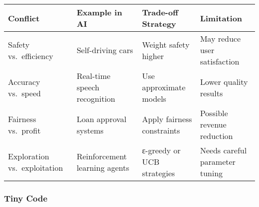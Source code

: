 \documentclass[
  letterpaper,
  DIV=11,
  numbers=noendperiod]{scrreprt}
\begin{document}
\begin{longtable}[]{@{}
  >{\raggedright\arraybackslash}p{}
  >{\raggedright\arraybackslash}p{}
  >{\raggedright\arraybackslash}p{}
  >{\raggedright\arraybackslash}p{}@{}}
\toprule\noalign{}
\begin{minipage}[b]{\linewidth}\raggedright
Conflict
\end{minipage} & \begin{minipage}[b]{\linewidth}\raggedright
Example in AI
\end{minipage} & \begin{minipage}[b]{\linewidth}\raggedright
Trade-off Strategy
\end{minipage} & \begin{minipage}[b]{\linewidth}\raggedright
Limitation
\end{minipage} \\
\midrule\noalign{}
\endhead
\bottomrule\noalign{}
\endlastfoot
Safety vs.~efficiency & Self-driving cars & Weight safety higher & May
reduce user satisfaction \\
Accuracy vs.~speed & Real-time speech recognition & Use approximate
models & Lower quality results \\
Fairness vs.~profit & Loan approval systems & Apply fairness constraints
& Possible revenue reduction \\
Exploration vs.~exploitation & Reinforcement learning agents & ε-greedy
or UCB strategies & Needs careful parameter tuning \\
\end{longtable}

\subsubsection{Tiny Code}\label{tiny-code-14}
\end{document}
